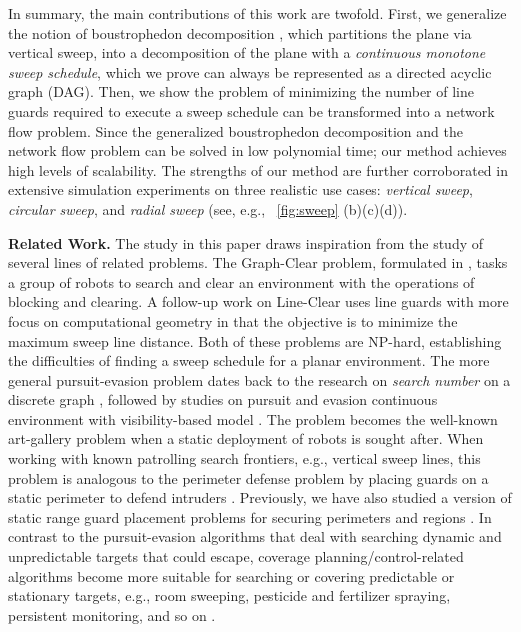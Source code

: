 In summary, the main contributions of this work are twofold. First, we generalize the 
notion of boustrophedon decomposition \cite{choset2000coverage}, which partitions the 
plane via vertical sweep, into a decomposition of the plane with a \emph{continuous 
monotone sweep schedule}, which we prove can always be represented as a directed 
acyclic graph (DAG). 
%
Then, we show the problem of minimizing the number of line guards required to execute a sweep schedule can be transformed into a network flow problem.
%
Since the generalized boustrophedon decomposition and the network flow problem can 
be solved in low polynomial time; our method achieves high levels of scalability.
%
The strengths of our method are further corroborated in extensive simulation experiments 
on three realistic use cases: \emph{vertical sweep}, \emph{circular sweep}, and 
\emph{radial sweep} (see, e.g., ~\ref{fig:sweep} (b)(c)(d)).





\noindent
\textbf{Related Work.}
The study in this paper draws inspiration from the study of several 
lines of related problems. 
The Graph-Clear problem, formulated in \cite{kolling2007graph}, tasks a group of robots to search and clear an environment with the operations of blocking and clearing.
A follow-up work on Line-Clear \cite{kolling2017coordinated} uses line guards
with more focus on computational geometry in that
the objective is to minimize the maximum sweep line distance. Both of these problems are
NP-hard, establishing the difficulties of finding a sweep schedule for a planar environment.
The more general pursuit-evasion problem dates back to the research on \emph{search number}
on a discrete graph \cite{megiddo1988complexity}, 
followed by studies on pursuit and evasion continuous environment with 
visibility-based model \cite{guibas1999visibility, suzuki1992searching, lavalle2000algorithm, stiffler2017persistent}. 
The problem becomes the well-known art-gallery problem \cite{o1987art} when a static deployment of robots is sought after.
%
When working with known patrolling search frontiers, e.g., vertical sweep lines, 
this problem is analogous to the perimeter defense problem by placing guards on a static perimeter
to defend intruders \cite{shishika2020cooperative, macharet2020adaptive, chen2021optimal}.
Previously, we have also studied a version of static range guard placement problems for securing perimeters and regions \cite{fengyu2020optimally}.
In contrast to the pursuit-evasion algorithms that deal with searching dynamic and unpredictable targets that could escape, 
coverage planning/control-related algorithms become more suitable for searching or covering predictable or stationary targets,
e.g., room sweeping, pesticide and fertilizer spraying, persistent monitoring, and so on \cite{cortes2004coverage, oksanen2009coverage, haksar2020spatial, wei2018coverage, deng2019constrained, lan2013planning, cassandras2012optimal, yu2015persistent, palacios2017optimal}. 

